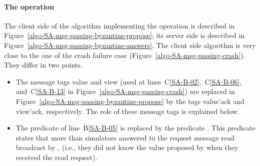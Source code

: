 \documentclass[11pt,letterpaper]{article}
\begin{document}
\paragraph{The operation }
The client side of the algorithm implementing the operation 
is described in Figure~\ref{algo-SA-msg-passing-byzantine-propose}; its server
side is described in Figure~\ref{algo-SA-msg-passing-byzantine-answers}.
The client side  algorithm is very close to the one of the crash failure case
(Figure~\ref{algo-SA-msg-passing-crash}).  They differ in two points.
\begin{itemize}
\vspace{-0.2cm}
\item
The  message tags {\sc value} and {\sc view} (used at
lines~C\ref{SA-B-02},~C\ref{SA-B-06},  and~C\ref{SA-B-13}
in Figure~\ref{algo-SA-msg-passing-crash}) are replaced
in Figure~\ref{algo-SA-msg-passing-byzantine-propose}
by the  tags  {\sc value'ack} and {\sc view'ack}, respectively. 
The role of these message tags is explained below.
\vspace{-0.2cm}
\item
The predicate of line~B\ref{SA-B-05}  is replaced by the predicate
.
This predicate states that more than  simulators
answered   to the request message {\sc  read} broadcast by ,
(i.e.,  they  did   not know the  value   proposed   by    when  they
received the  read request).
\end{itemize}
\end{document}

